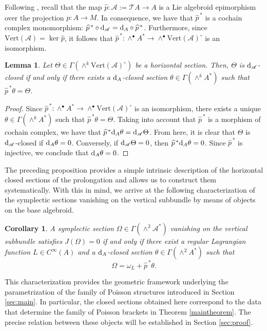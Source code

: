 \documentclass[12pt,letterpaper]{article}
\newcommand{\A}{\mathscr{A}}
\let\oldd\d
\renewcommand{\d}{%
  \relax\ifmmode\mathrm{d}\else\oldd\fi
}
\renewcommand{\hat}{\widehat}
\newtheorem{corollary}[theorem]{Corollary}
\newtheorem{lemma}[theorem]{Lemma}
\numberwithin{equation}{section}
\begin{document}
Following \cite{Martinez2001}, recall that the map $\hat{p}:\A:=\mathcal{T} A \rightarrow A$ is a Lie algebroid epimorphism over the projection $p:A\rightarrow M$.
In consequence, we have that $\hat{p}^{\,*}$ is a cochain complex monomorphism: $\hat{p}^{\,*} \circ \d_{\A} = \d_A \circ \hat{p}^{\,*}$.
Furthermore, since $\mathrm{Vert}(\A)=\ker\hat{p}$, 
it follows that $\hat{p}^{\,*}:\wedge^{\bullet}A^*\to\wedge^{\bullet}\mathrm{Vert}(\A)^\circ$ is an isomorphism.

\begin{lemma}\label{lemma-hor-closed}
  Let $\Theta\in\Gamma(\wedge^k\mathrm{Vert}(\A)^{\circ})$ be a horizontal section. 
  Then, $\Theta$ is $\d_\A$-closed if and only if
  there exists a $\d_A$-closed section $\theta\in\Gamma(\wedge^kA^*)$ such that $\hat{p}^{\,*}\theta = \Theta$.
\end{lemma}

\begin{proof}
  Since $\hat{p}^{\,*}:\wedge^{\bullet}A^*\to\wedge^{\bullet}\mathrm{Vert}(\A)^\circ$ is an isomorphism,
  there exists a unique $\theta\in\Gamma(\wedge^kA^*)$ such that $\hat{p}^{\,*}\theta = \Theta$.
  Taking into account that $\hat{p}^{\,*}$ is a morphism of cochain complex, we have that $\hat{p}^{\,*}\d_A\theta = \d_{\A}\Theta$.
  From here, it is clear that $\Theta$ is $\d_{\A}$-closed if $\d_A\theta = 0$.
  Conversely, if $\d_{\A}\Theta = 0$, then $\hat{p}^{\,*}\d_A\theta = 0$.
  Since $\hat{p}^{\,*}$ is injective, we conclude that $\d_A\theta = 0$.
\end{proof}

The preceding proposition provides a simple intrinsic description of the horizontal closed sections of the prolongation 
and allows us to construct them systematically.
With this in mind, we arrive at the following characterization of the symplectic sections vanishing on the vertical subbundle by means of objects on the base algebroid.

\begin{corollary}\label{cor-hor-clos}
A symplectic section $\Omega\in\Gamma(\wedge^2\A^*)$ vanishing on the vertical subbundle satisfies $J(\Omega)=0$ if and only if
there exist a regular Lagrangian function $L\in C^\infty(A)$ and a $\d_A$-closed section $\theta \in \Gamma(\wedge^2 A^*)$ such that
\[
  \Omega = \omega_L + \hat{p}^{\, *}\theta.
\]
\end{corollary} 

This characterization provides the geometric framework underlying the parametrization of the family of Poisson structures introduced in Section \ref{sec:main}. 
In particular, the closed sections obtained here correspond to the data that determine the family of Poisson brackets in Theorem \ref{maintheorem}. 
The precise relation between these objects will be established in Section \ref{sec:proof}.
\end{document}
